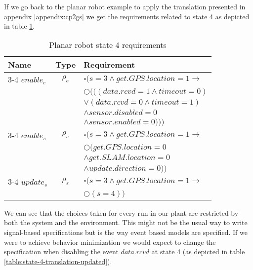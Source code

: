 If we go back to the
planar robot example to apply the translation presented in appendix
\ref{appendix:cp2gs} we get the requirements related to state 4
as depicted in table \ref{table:state-4-translation}.

\begin{center}
\begin{table}[h]
  \begin{tabular}{ l  c  l }
	Name & Type & Requirement \\
    \hline
    3-4 $enable_e$ & $\rho_e$ & $\square(s=3 \wedge get.GPS.location = 1 \rightarrow$\\
    &&$\Circle(((data.rcvd = 1 \wedge timeout = 0)$\\
    &&$\vee(data.rcvd=0 \wedge timeout = 1)$\\
    &&$\wedge sensor.disabled = 0$\\
    &&$\wedge sensor.enabled = 0)))$\\
    3-4 $enable_s$ & $\rho_s$ & $\square(s=3 \wedge get.GPS.location = 1 \rightarrow$\\
        &&$\Circle(get.GPS.location = 0 $\\
        &&$\wedge get.SLAM.location = 0$\\
        &&$\wedge update.direction = 0))$\\
    3-4 $update_s$ & $\rho_s$ & $\square(s=3 \wedge get.GPS.location = 1 \rightarrow$\\
        &&$\Circle(s = 4))$\\        
  \end{tabular}
  \caption{Planar robot state 4 requirements}
  \label{table:state-4-translation}
 \end{table}
\end{center}

We can see that the choices taken for every run in our plant are
restricted by both the system and the environment.  This might not be
the usual way to write signal-based specifications but is the way event
based models are specified.  If we were to achieve behavior minimization
we would expect to change the specification when disabling the event $data.rcvd$
at state 4 (as depicted in table \ref{table:state-4-translation-updated}).

